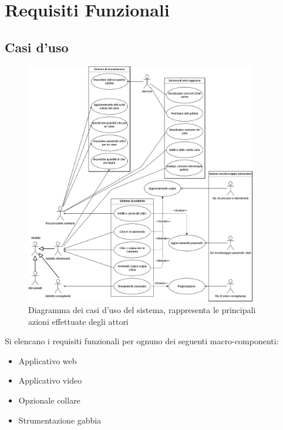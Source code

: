 	\section{Requisiti Funzionali} %
	    \subsection{Casi d'uso}
            \begin{figure}[ht]
                \caption{Diagramma dei casi d'uso del sistema, rappresenta le principali azioni effettuate degli attori}
                \centering
                \includegraphics[width=0.9\textwidth]{DrawIo/useCaseWholeSystem.png}
            \end{figure}
            
    	Si elencano i requisiti funzionali per ognuno dei seguenti macro-componenti:
	    \begin{itemize}
            \item Applicativo web 
            \item Applicativo video
            \item Opzionale collare
            \item Strumentazione gabbia
        \end{itemize}
        
